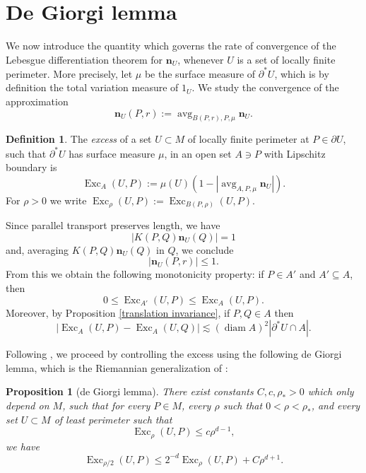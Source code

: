 \documentclass[reqno,11pt]{amsart}
\DeclareMathOperator{\avg}{avg}
\DeclareMathOperator{\diam}{diam}
\DeclareMathOperator{\Exc}{Exc}
\newcommand{\normal}{\mathbf n}
\newcommand{\dfn}[1]{\emph{#1}\index{#1}}
\newtheorem{proposition}[theorem]{Proposition}
\theoremstyle{definition}
\newtheorem{definition}[theorem]{Definition}
\numberwithin{equation}{section}
\begin{document}
\section{De Giorgi lemma}\label{DeGiorgiSec}
We now introduce the quantity which governs the rate of convergence of the Lebesgue differentiation theorem for $\normal_U$, whenever $U$ is a set of locally finite perimeter.
More precisely, let $\mu$ be the surface measure of $\partial^* U$, which is by definition the total variation measure of $1_U$.
We study the convergence of the approximation
$$\normal_U(P, r) := \avg_{B(P, r), P, \mu} \normal_U.$$

\begin{definition}
The \dfn{excess} of a set $U \subset M$ of locally finite perimeter at $P \in \partial U$, such that $\partial^* U$ has surface measure $\mu$, in an open set $A \ni P$ with Lipschitz boundary is
$$\Exc_A(U, P) := \mu(U)\left(1 - \left|\avg_{A, P, \mu} \normal_U\right|\right).$$
For $\rho > 0$ we write $\Exc_\rho(U, P) := \Exc_{B(P, \rho)}(U, P)$.
\end{definition}

Since parallel transport preserves length, we have
$$|K(P, Q) \normal_U(Q)| = 1$$
and, averaging $K(P, Q) \normal_U(Q)$ in $Q$, we conclude
\begin{equation}\label{normal isnt too big}
|\normal_U(P, r)| \leq 1.
\end{equation}
From this we obtain the following monotonicity property: if $P \in A'$ and $A' \subseteq A$, then
\begin{equation}\label{approximate monotone}
0 \leq \Exc_{A'}(U, P) \leq \Exc_A(U, P).
\end{equation}
Moreover, by Proposition \ref{translation invariance}, if $P, Q \in A$ then 
\begin{equation}\label{translation invariant excess}
|\Exc_A(U, P) - \Exc_A(U, Q)| \lesssim (\diam A)^2 |\partial^* U \cap A|.
\end{equation}

Following \cite{Miranda66,Giusti77,deGiorgi61}, we proceed by controlling the excess using the following de Giorgi lemma, which is the Riemannian generalization of \cite[Theorem 8.1]{Giusti77}:

\begin{proposition}[de Giorgi lemma]\label{de Giorgi}
There exist constants $C, c, \rho_* > 0$ which only depend on $M$, such that for every $P \in M$, every $\rho$ such that $0 < \rho < \rho_*$, and every set $U \subset M$ of least perimeter such that
\begin{equation}\label{base case}
\Exc_\rho(U, P) \leq c\rho^{d - 1},
\end{equation}
we have
\begin{equation}\label{dGL concl}
\Exc_{\rho/2}(U, P) \leq 2^{-d} \Exc_\rho(U, P) + C\rho^{d + 1}.
\end{equation}
\end{proposition}
\end{document}
